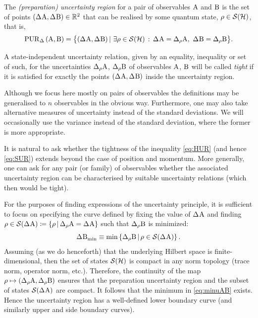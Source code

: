 \begin{dfn}
  The {\em (preparation) uncertainty region} for a pair of observables $\operatorname{A}$ and $\operatorname{B}$ is the set of points $(\sdev{\opa}, \sdev{\opb})\in \mathbb{R}^2$  that can be realised by some quantum state, $\rho\in\mathcal{S}(\mathcal{H})$, that is,
  \begin{equation}%
   \PUR{\Delta}{\opa}{\opb} = \bigl\{(\sdev{\opa},\sdev{\opb})\,|\,\,\exists\rho\in\si(\hi)\,:\,\sdev{\opa}=\sdevr{\opa},\ \sdev{\opb}=\sdevr{\opb}\bigr\}. %
  \end{equation}
\end{dfn}
\begin{dfn}\label{def:tight}
  A state-independent uncertainty relation, given by an equality, inequality or set of such, for the uncertainties $\sdevr{\opa}$, $\sdevr{\opb}$ of observables $\operatorname{A}$, $\operatorname{B}$ will be called {\em tight} if it is satisfied for exactly the points $(\sdev{\opa}, \sdev{\opb})$ inside the uncertainty region.
\end{dfn}
Although we focus here mostly on pairs of observables the definitions may be generalised to $n$ observables in the obvious way. Furthermore, one may also take alternative measures of uncertainty instead of the standard deviations. We will occasionally use the variance instead of the standard deviation, where the former is more appropriate.

It is natural to ask whether the tightness of the inequality \eqref{eq:HUR} (and hence \eqref{eq:SUR}) extends beyond the case of position and momentum. More generally, one can ask for any pair (or family) of observables whether the associated uncertainty region can be characterised by suitable uncertainty relations (which then would be tight).

For the purposes of finding expressions of the uncertainty principle, it is sufficient to focus on specifying the curve defined by fixing the value of $\sdev{\opa}$ and finding $\rho\in\si(\sdev{\opa})\coloneqq\{\rho\,|\,\sdevr{\opa}=\sdev{\opa}\}$ such that $\sdevr{\opb}$ is minimized:
\begin{equation}\label{eq:minuAB}
  \sdevmin{\opb}\equiv\min\left\{\sdevr{\opb}\,|\,\rho \in\si(\sdev{\opa}) \right\}.
\end{equation}
Assuming (as we do henceforth) that the underlying Hilbert space is finite-dimensional, then the set of states $\mathcal{S}(\mathcal{H})$ is compact in any norm topology (trace norm, operator norm, etc.). Therefore, the continuity of the map $\rho\mapsto (\sdevr{\opa},\sdevr{\opb})$ ensures that the preparation uncertainty region and the subset of states $\si(\sdev{\opa})$ are  compact. It follows that the minimum in \eqref{eq:minuAB} exists. Hence the uncertainty region has a well-defined  lower boundary curve (and similarly upper and side boundary curves).

